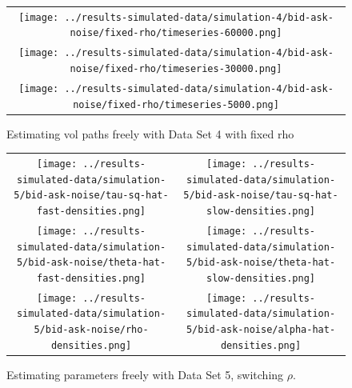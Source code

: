 \documentclass[10pt]{article}
\begin{document}
\begin{figure}
  \centering
  \begin{tabular}{c}
    \begin{minipage}{0.80\textwidth}
      \centering
      \texttt{[image: ../results-simulated-data/simulation-4/bid-ask-noise/fixed-rho/timeseries-60000.png]}
    \end{minipage} \\
    \begin{minipage}{0.80\textwidth}
      \centering
      \texttt{[image: ../results-simulated-data/simulation-4/bid-ask-noise/fixed-rho/timeseries-30000.png]}
    \end{minipage} \\
    \begin{minipage}{0.80\textwidth}
      \centering
      \texttt{[image: ../results-simulated-data/simulation-4/bid-ask-noise/fixed-rho/timeseries-5000.png]}
    \end{minipage}
  \end{tabular}
  \caption{Estimating vol paths freely with Data Set 4 with fixed rho}
\end{figure}


\begin{figure}
  \centering
  \begin{tabular}{cc}
    \begin{minipage}{0.45\textwidth}
      \centering
      \texttt{[image: ../results-simulated-data/simulation-5/bid-ask-noise/tau-sq-hat-fast-densities.png]}
    \end{minipage}
    & \begin{minipage}{0.45\textwidth}
      \centering
      \texttt{[image: ../results-simulated-data/simulation-5/bid-ask-noise/tau-sq-hat-slow-densities.png]}
      \end{minipage} \\
    \begin{minipage}{0.45\textwidth}
      \centering
      \texttt{[image: ../results-simulated-data/simulation-5/bid-ask-noise/theta-hat-fast-densities.png]}
    \end{minipage}
    & \begin{minipage}{0.45\textwidth}
      \centering
      \texttt{[image: ../results-simulated-data/simulation-5/bid-ask-noise/theta-hat-slow-densities.png]}
    \end{minipage} \\
    \begin{minipage}{0.45\textwidth}
      \centering
      \texttt{[image: ../results-simulated-data/simulation-5/bid-ask-noise/rho-densities.png]}
    \end{minipage}
    & \begin{minipage}{0.45\textwidth}
      \centering
      \texttt{[image: ../results-simulated-data/simulation-5/bid-ask-noise/alpha-hat-densities.png]}
    \end{minipage}
  \end{tabular}
  \caption{Estimating parameters freely with Data Set 5, switching $\rho$.}
\end{figure}
\end{document}

